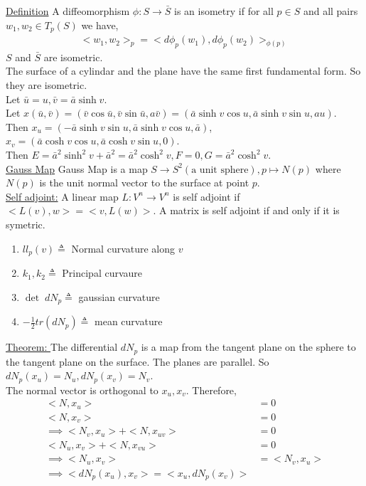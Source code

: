 \documentclass[12pt,letterpaper]{hmcpset}
\begin{document}
\underline{Definition} A diffeomorphism $\phi: S \rightarrow \bar{S}$ is an isometry if for
all $p \in S$ and all pairs $w_1, w_2 \in T_p(S)$ we have,
\begin{align*}
  <w_1, w_2>_p = <d\phi_p(w_1), d\phi_p(w_2)>_{\phi(p)}
\end{align*}
$S$ and $\bar{S}$ are isometric. \\
The surface of a cylindar and the plane have the same first fundamental form. So they are
isometric.  \\

Let $\bar{u} = u, \bar{v} = \bar{a} \sinh v$.  \\
Let $x(\bar{u}, \bar{v}) = (\bar{v} \cos \bar{u}, \bar{v} \sin \bar{u}, a
\bar{v}) = (\bar{a} \sinh v \cos u, \bar{a} \sinh v \sin u, au)$. \\
Then $x_u = (-\bar{a} \sinh v \sin u, \bar{a} \sinh v \cos u, \bar{a})$, \\
$x_v = (\bar{a} \cosh v \cos u, \bar{a} \cosh v \sin u, 0)$. \\
Then $E = \bar{a}^2 \sinh^2 v + \bar{a}^2 = \bar{a}^2\cosh^2 v, F = 0, G =
\bar{a}^2 \cosh^2 v$.\\
\underline{Gauss Map}
Gauss Map is a map $S \rightarrow S^2 (\text{a unit sphere}), p \mapsto N(p)$ where $N(p)$ is the
unit normal vector to the surface at point $p$.\\
\underline{Self adjoint:} A linear map $L: V^n \rightarrow V^n$ is self adjoint if $<L(v),
w> = <v, L(w)>$. A matrix is self adjoint if and only if it is symetric. \\
\begin{enumerate}
\item $ll_p(v) \triangleq $ Normal curvature along $v$
\item $k_1, k_2 \triangleq$ Principal curvaure
\item $\det\; dN_p \triangleq$ gaussian curvature
\item $-\frac{1}{2} tr(dN_p) \triangleq$ mean curvature
\end{enumerate}
\underline{Theorem: } The differential $dN_p$ is a map from the tangent plane on
the sphere to the tangent plane on the surface. The planes are parallel. So
$dN_p(x_u) = N_u, dN_p(x_v) = N_v$. \\
The normal vector is orthogonal to $x_u, x_v$. Therefore,
\begin{align*}
  <N, x_u> &= 0 \\
  <N, x_v> &= 0 \\
  \implies <N_v, x_u> + <N, x_{uv}> &= 0 \\
  <N_u, x_v> + <N, x_{vu}> &= 0 \\
  \implies <N_u, x_v> &= <N_v, x_u> \\
  \implies <dN_p(x_u), x_v> = <x_u, dN_p(x_v)>
\end{align*}
\end{document}
